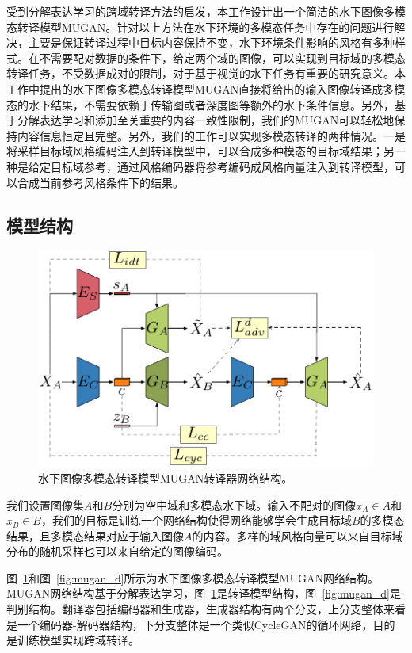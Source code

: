 受到分解表达学习的跨域转译方法的启发，本工作设计出一个简洁的水下图像多模态转译模型MUGAN。针对以上方法在水下环境的多模态任务中存在的问题进行解决，主要是保证转译过程中目标内容保持不变，水下环境条件影响的风格有多种样式。在不需要配对数据的条件下，给定两个域的图像，可以实现到目标域的多模态转译任务，不受数据成对的限制，对于基于视觉的水下任务有重要的研究意义。本工作中提出的水下图像多模态转译模型MUGAN直接将给出的输入图像转译成多模态的水下结果，不需要依赖于传输图或者深度图等额外的水下条件信息。另外，基于分解表达学习和添加至关重要的内容一致性限制，我们的MUGAN可以轻松地保持内容信息恒定且完整。另外，我们的工作可以实现多模态转译的两种情况。一是将采样目标域风格编码注入到转译模型中，可以合成多种模态的目标域结果；另一种是给定目标域参考，通过风格编码器将参考编码成风格向量注入到转译模型，可以合成当前参考风格条件下的结果。

\subsection{模型结构}

\begin{figure}[ht]
    \centering
    \includegraphics[width=1\textwidth]{figures/G.pdf}
    \caption{水下图像多模态转译模型MUGAN转译器网络结构。}
    \label{fig:mugan_g}
\end{figure}

我们设置图像集$A$和$B$分别为空中域和多模态水下域。输入不配对的图像$x_A \in A$和$x_B \in B$，我们的目标是训练一个网络结构使得网络能够学会生成目标域$B$的多模态结果，且多模态结果对应于输入图像$A$的内容。多样的域风格向量可以来自目标域分布的随机采样也可以来自给定的图像编码。

图~\ref{fig:mugan_g}和图~\ref{fig:mugan_d}所示为水下图像多模态转译模型MUGAN网络结构。MUGAN网络结构基于分解表达学习，图~\ref{fig:mugan_g}是转译模型结构，图~\ref{fig:mugan_d}是判别结构。翻译器包括编码器和生成器，生成器结构有两个分支，上分支整体来看是一个编码器-解码器结构，下分支整体是一个类似CycleGAN的循环网络，目的是训练模型实现跨域转译。

